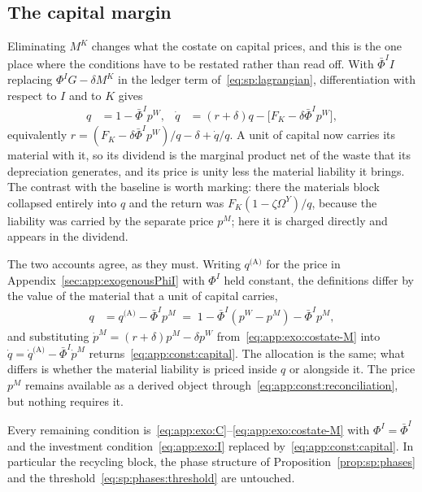 \subsection{The capital margin}\label{sec:app:const:capital}

Eliminating $M^K$ changes what the costate on capital prices, and this is the one place where the
conditions have to be restated rather than read off. With $\bar\Phi^II$ replacing
$\Phi^IG-\delta M^K$ in the ledger term of~\eqref{eq:sp:lagrangian}, differentiation with respect to
$I$ and to $K$ gives
\begin{align}
q &= 1-\bar\Phi^Ip^W,
&
\dot q &= \left(r+\delta\right)q-\Big[F_K-\delta\bar\Phi^Ip^W\Big],
\label{eq:app:const:capital}
\end{align}
equivalently $r=\left(F_K-\delta\bar\Phi^Ip^W\right)/q-\delta+\dot q/q$. A unit of capital now carries
its material with it, so its dividend is the marginal product net of the waste that its depreciation
generates, and its price is unity less the material liability it brings. The contrast with the baseline
is worth marking: there the materials block collapsed entirely into $q$ and the return
was $F_K\left(1-\zeta\Omega^Y\right)/q$, because the liability was carried by the separate price $p^M$;
here it is charged directly and appears in the dividend.

The two accounts agree, as they must. Writing $q^{\text{(A)}}$ for the price in
Appendix~\ref{sec:app:exogenousPhiI} with $\Phi^I$ held constant, the definitions differ by the value
of the material that a unit of capital carries,
\begin{align}
q &= q^{\text{(A)}}-\bar\Phi^Ip^M
\;=\;1-\bar\Phi^I\left(p^W-p^M\right)-\bar\Phi^Ip^M ,
\label{eq:app:const:reconciliation}
\end{align}
and substituting $\dot p^M=\left(r+\delta\right)p^M-\delta p^W$
from~\eqref{eq:app:exo:costate-M} into $\dot q=\dot q^{\text{(A)}}-\bar\Phi^I\dot p^M$
returns~\eqref{eq:app:const:capital}. The allocation is the same; what differs is whether the material
liability is priced inside $q$ or alongside it. The price $p^M$ remains available as a derived object
through~\eqref{eq:app:const:reconciliation}, but nothing requires it.

Every remaining condition is~\eqref{eq:app:exo:C}--\eqref{eq:app:exo:costate-M} with $\Phi^I=\bar\Phi^I$
and the investment condition~\eqref{eq:app:exo:I} replaced by~\eqref{eq:app:const:capital}. In particular the
recycling block, the phase structure of Proposition~\ref{prop:sp:phases} and the
threshold~\eqref{eq:sp:phases:threshold} are untouched.


